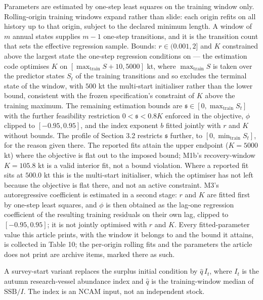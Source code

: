 \documentclass[11pt]{article}
\begin{document}
Parameters are estimated by one-step least squares on the training
window only. Rolling-origin training windows expand rather than slide:
each origin refits on all history up to that origin, subject to the
declared minimum length. A window of \(m\) annual states supplies
\(m-1\) one-step transitions, and it is the transition count that sets
the effective regression sample. Bounds: \(r\in(0.001,2]\) and \(K\) constrained above the
largest state the one-step regression conditions on --- the estimation
code optimises \(K\) on \([\max_{\mathrm{train}} S + 10, 5000]\) kt,
where \(\max_{\mathrm{train}} S\) is taken over the predictor states
\(S_t\) of the training transitions and so excludes the terminal state
of the window, with \(500\) kt the
multi-start initialiser rather than the lower bound, consistent with the
frozen specification's constraint of \(K\) above the training maximum.
The remaining estimation bounds are
\(\mathfrak s \in [0, \max_{\mathrm{train}} S_t]\) with the further
feasibility restriction \(0 < \mathfrak s < 0.8K\) enforced in the
objective, \(\phi\) clipped to \([-0.95, 0.95]\), and the index
exponent \(b\) fitted jointly with \(r\) and \(K\) without bounds.
The profile of Section 3.2 restricts \(\mathfrak s\) further, to
\([0, \min_{\mathrm{train}} S_t]\), for the reason given there. The
reported fits attain the upper endpoint (\(K = 5000\) kt) where the
objective is flat out to the imposed bound; M1b's recovery-window
\(K = 105.8\) kt is a valid interior fit, not a bound violation. Where a
reported fit sits at \(500.0\) kt this is the multi-start initialiser,
which the optimiser has not left because the objective is flat there,
and not an active constraint. M3's autoregressive coefficient is
estimated in a second stage: \(r\) and \(K\) are fitted first by
one-step least squares, and \(\phi\) is then obtained as the
lag-one regression coefficient of the resulting training residuals on
their own lag, clipped to \([-0.95, 0.95]\); it is not jointly
optimised with \(r\) and \(K\). Every
fitted-parameter value this article prints, with the window it belongs
to and the bound it attains, is collected in Table 10; the per-origin
rolling fits and the parameters the article does not print are archive
items, marked there as such.

A survey-start variant replaces the surplus initial condition by
\(\hat q\,I_t\), where \(I_t\) is the autumn research-vessel abundance
index and \(\hat q\) is the training-window median of
\(\mathrm{SSB}/I\). The index is an NCAM input, not an independent
stock.
\end{document}
